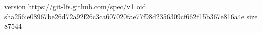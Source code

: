 version https://git-lfs.github.com/spec/v1
oid sha256:e08967be26d72a92f26c3ca607020fae77f98d2356309cf662f15b367e816a4e
size 87544
